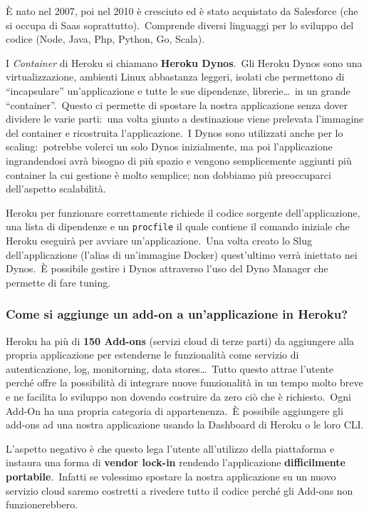 \documentclass[12pt, a4paper]{article}
\begin{document}
È nato nel 2007, poi nel 2010 è cresciuto ed è stato acquistato da Salesforce (che si occupa di Saas soprattutto).\
Comprende diversi linguaggi per lo sviluppo del codice (Node, Java, Php, Python, Go, Scala).\

I \textit{Container} di Heroku si chiamano \textbf{Heroku Dynos}.\
Gli Heroku Dynos sono una virtualizzazione, ambienti Linux abbastanza leggeri, isolati che permettono di ``incapsulare'' un'applicazione e tutte le sue dipendenze, librerie\dots\ in un grande ``container''.\
Questo ci permette di spostare la nostra applicazione senza dover dividere le varie parti:\ una volta giunto a destinazione viene prelevata l'immagine del container e ricostruita l'applicazione.\
I Dynos sono utilizzati anche per lo scaling:\ potrebbe volerci un solo Dynos inizialmente, ma poi l'applicazione ingrandendosi avrà bisogno di più spazio e vengono semplicemente aggiunti più container la cui gestione è molto semplice; non dobbiamo più preoccuparci dell'aspetto scalabilità.\

Heroku per funzionare correttamente richiede il codice sorgente dell'applicazione, una lista di dipendenze e un \texttt{procfile} il quale contiene il comando iniziale che Heroku eseguirà per avviare un'applicazione.\
Una volta creato lo Slug dell'applicazione (l'alias di un'immagine Docker) quest'ultimo verrà iniettato nei Dynos.\
È possibile gestire i Dynos attraverso l'uso del Dyno Manager che permette di fare tuning.

\subsubsection*{Come si aggiunge un add-on a un'applicazione in Heroku?}

Heroku ha più di \textbf{150 Add-ons} (servizi cloud di terze parti) da aggiungere alla propria applicazione per estenderne le funzionalità come servizio di autenticazione, log, monitorning, data stores\dots\
Tutto questo attrae l'utente perché offre la possibilità di integrare nuove funzionalità in un tempo molto breve e ne facilita lo sviluppo non dovendo costruire da zero ciò che è richiesto.\
Ogni Add-On ha una propria categoria di appartenenza.\
È possibile aggiungere gli add-ons ad una nostra applicazione usando la Dashboard di Heroku o le loro CLI.

L'aspetto negativo è che questo lega l'utente all'utilizzo della piattaforma e instaura una forma di \textbf{vendor lock-in} rendendo l'applicazione \textbf{difficilmente portabile}.\
Infatti se volessimo spostare la nostra applicazione su un nuovo servizio cloud saremo costretti a rivedere tutto il codice perché gli Add-ons non funzionerebbero.
\end{document}
